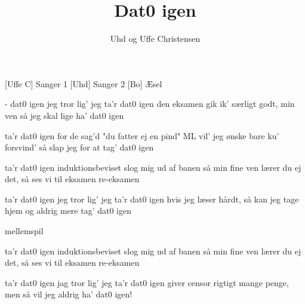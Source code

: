 \documentclass[a4paper,11pt]{article}
\title{Dat0 igen}
\author{Uhd og Uffe Christensen}
\begin{document}
\maketitle

\begin{roles}
  [Uffe C] Sanger 1
  [Uhd] Sanger 2
  [Bo] Æsel
\end{roles}

\begin{props}
\end{props}

\begin{song}

  - dat0 igen
  jeg tror lig' jeg ta'r dat0 igen
  den eksamen gik ik' særligt godt, min ven
  så jeg skal lige ha' dat0 igen  


  ta'r dat0 igen
  for de sag'd "du fatter ej en pind"
  ML vil' jeg ønske bare ku' forsvind'
  så slap jeg for at tag' dat0 igen
  
  ta'r dat0 igen
  induktionsbeviset slog mig ud af banen
  så min fine ven
  lærer du ej det, så ses vi til eksamen
  re-eksamen
  
  ta'r dat0 igen
  jeg tror lig' jeg ta'r dat0 igen
  hvis jeg læser hårdt, så kan jeg tage hjem
  og aldrig mere tag' dat0 igen
  
  \scene mellemspil
  
  ta'r dat0 igen
  induktionsbeviset slog mig ud af banen
  så min fine ven
  lærer du ej det, så ses vi til eksamen
  re-eksamen
  
  ta'r dat0 igen
  jag tror lig' jeg ta'r dat0 igen
  giver censor rigtigt mange penge, men
  så vil jeg aldrig ha' dat0 igen!
  
\end{song}
\end{document}
